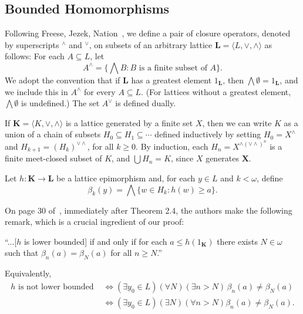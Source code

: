 \subsection{Bounded Homomorphisms}
\label{sec:bound-homom}

Following Freese, Jezek, Nation~\cite{MR1319815}, we define a pair of closure operators, denoted by superscripts $^\wedge$ and $^\vee$, on  subsets of an arbitrary lattice
$\mathbf L = \langle L, \vee, \wedge\rangle$ as follows: For each $A\subseteq L$, let
\[
A^\wedge = \{\bigwedge B : B \text{ is a finite subset of } A\}.
\]
We adopt the convention that if $\mathbf L$ has a greatest element $1_{\mathbf L}$, then 
$\bigwedge \emptyset = 1_{\mathbf L}$, and we include this in $A^\wedge$ for every $A \subseteq L$.
(For lattices without a greatest element, $\bigwedge \emptyset$ is undefined.)  The set $A^\vee$ is defined dually.

If $\mathbf K = \langle K, \vee, \wedge\rangle$ is a lattice generated by a finite set $X$, then we can write $K$ as a union of a chain of subsets $H_0\subseteq H_1 \subseteq \cdots$ defined inductively by setting $H_0 = X^\wedge$ and $H_{k+1} = (H_k)^{\vee \wedge}$, for all $k\geqslant 0$. By induction, each $H_n = X^{\wedge(\vee\wedge)^n}$ is a finite meet-closed subset of $K$, and $\bigcup H_n = K$, since $X$  generates $\mathbf X$.

Let $h \colon \mathbf K \to \mathbf L$ be a lattice epimorphism and, for each $y \in L$ and $k< \omega$, define
\[
\beta_k(y) = \bigwedge \{w \in H_k : h(w) \geqslant a\}.
\]

On page 30 of~\cite{MR1319815}, immediately after Theorem 2.4, the authors make the following remark, which is a crucial ingredient of our proof:

``...[$h$ is lower bounded] if and only if for each $a \leqslant h(1_{\mathbf K})$ there exists $N\in \omega$ such that $\beta_n(a) = \beta_N(a)$ for all $n\geqslant N$.''

Equivalently, 
\begin{align}
h \text{ is not lower bounded } &\iff (\exists y_0 \in L)(\forall N)(\exists n> N)\, \beta_n(a) \neq \beta_N(a) \nonumber \\
&\iff (\exists y_0 \in L)(\exists N)(\forall n> N) \beta_n(a) \neq \beta_N(a).\nonumber
\end{align}
